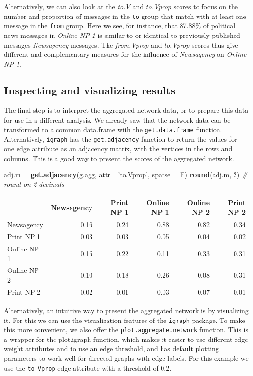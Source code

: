 \documentclass[]{article}
\newenvironment{Shaded}{\begin{snugshade}}{\end{snugshade}}
\newcommand{\KeywordTok}[1]{\textcolor[rgb]{0.13,0.29,0.53}{\textbf{{#1}}}}
\newcommand{\DataTypeTok}[1]{\textcolor[rgb]{0.13,0.29,0.53}{{#1}}}
\newcommand{\DecValTok}[1]{\textcolor[rgb]{0.00,0.00,0.81}{{#1}}}
\newcommand{\StringTok}[1]{\textcolor[rgb]{0.31,0.60,0.02}{{#1}}}
\newcommand{\CommentTok}[1]{\textcolor[rgb]{0.56,0.35,0.01}{\textit{{#1}}}}
\newcommand{\NormalTok}[1]{{#1}}
\begin{document}
Alternatively, we can also look at the \emph{to.V} and \emph{to.Vprop}
scores to focus on the number and proportion of messages in the
\texttt{to} group that match with at least one message in the
\texttt{from} group. Here we see, for instance, that 87.88\% of
political news messages in \emph{Online NP 1} is similar to or identical
to previously published messages \emph{Newsagency} messages. The
\emph{from.Vprop} and \emph{to.Vprop} scores thus give different and
complementary measures for the influence of \emph{Newsagency} on
\emph{Online NP 1}.

\subsection{Inspecting and visualizing
results}\label{inspecting-and-visualizing-results}

The final step is to interpret the aggregated network data, or to
prepare this data for use in a different analysis. We already saw that
the network data can be transformed to a common data.frame with the
\texttt{get.data.frame} function. Alternatively, \texttt{igraph} has the
\texttt{get.adjacency} function to return the values for one edge
attribute as an adjacency matrix, with the vertices in the rows and
columns. This is a good way to present the scores of the aggregated
network.

\begin{Shaded}
\begin{Highlighting}[]
\NormalTok{adj.m =}\StringTok{ }\KeywordTok{get.adjacency}\NormalTok{(g.agg, }\DataTypeTok{attr=} \StringTok{'to.Vprop'}\NormalTok{, }\DataTypeTok{sparse =} \NormalTok{F)}
\KeywordTok{round}\NormalTok{(adj.m, }\DecValTok{2}\NormalTok{) }\CommentTok{# round on 2 decimals}
\end{Highlighting}
\end{Shaded}

\begin{longtable}[c]{@{}lrrrrr@{}}
\toprule
& Newsagency & Print NP 1 & Online NP 1 & Online NP 2 & Print NP
2\tabularnewline
\midrule
\endhead
Newsagency & 0.16 & 0.24 & 0.88 & 0.82 & 0.34\tabularnewline
Print NP 1 & 0.03 & 0.03 & 0.05 & 0.04 & 0.02\tabularnewline
Online NP 1 & 0.15 & 0.22 & 0.11 & 0.33 & 0.31\tabularnewline
Online NP 2 & 0.10 & 0.18 & 0.26 & 0.08 & 0.31\tabularnewline
Print NP 2 & 0.02 & 0.01 & 0.03 & 0.07 & 0.01\tabularnewline
\bottomrule
\end{longtable}

Alternatively, an intuitive way to present the aggregated network is by
visualizing it. For this we can use the visualization features of the
\texttt{igraph} package. To make this more convenient, we also offer the
\texttt{plot.aggregate.network} function. This is a wrapper for the
plot.igraph function, which makes it easier to use different edge weight
attributes and to use an edge threshold, and has default plotting
parameters to work well for directed graphs with edge labels. For this
example we use the \texttt{to.Vprop} edge attribute with a threshold of
0.2.
\end{document}
